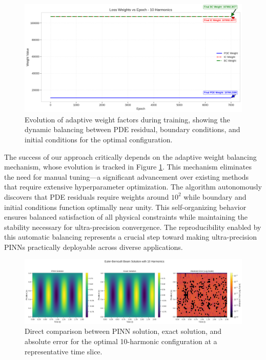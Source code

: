 \begin{figure}[ht]
    \centering
    \includegraphics[width = 1.0\linewidth]{figures/weight_factors_10h.png}
    \caption{Evolution of adaptive weight factors during training, showing the dynamic balancing between PDE residual, boundary conditions, and initial conditions for the optimal configuration.}
    \label{fig:weight_factors}
\end{figure}

The success of our approach critically depends on the adaptive weight balancing mechanism, whose evolution is tracked in Figure \ref{fig:weight_factors}. This mechanism eliminates the need for manual tuning—a significant advancement over existing methods that require extensive hyperparameter optimization. The algorithm autonomously discovers that PDE residuals require weights around $10^2$ while boundary and initial conditions function optimally near unity. This self-organizing behavior ensures balanced satisfaction of all physical constraints while maintaining the stability necessary for ultra-precision convergence. The reproducibility enabled by this automatic balancing represents a crucial step toward making ultra-precision PINNs practically deployable across diverse applications.

\begin{figure}[ht]
    \centering
    \includegraphics[width = 1.0\linewidth]{figures/comparison_10h.png}
    \caption{Direct comparison between PINN solution, exact solution, and absolute error for the optimal 10-harmonic configuration at a representative time slice.}
    \label{fig:comparison_10h}
\end{figure}


